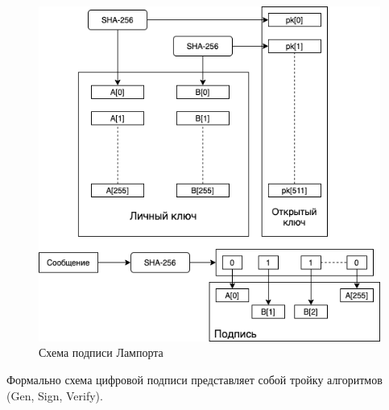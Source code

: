 \documentclass[a4paper, 14pt]{extarticle}
\begin{document}
\begin{figure}[h]
    \centering
    \includegraphics[scale=0.71]{lamport.png}
    \caption{Схема подписи Лампорта}
    \label{fig:lamport}
\end{figure}

\newpage

Формально схема цифровой подписи представляет собой тройку алгоритмов (Gen, Sign, Verify).
\end{document}
